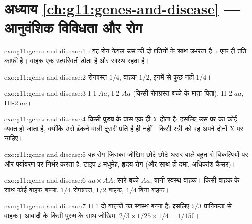 \section*{अध्याय \ref{ch:g11:genes-and-disease} --- आनुवंशिक विविधता और रोग}

\begin{solution}{exo:g11:genes-and-disease:1}
: वह रोग केवल उस  की दो प्रतियों के साथ उभरता है; :
एक ही प्रति काफ़ी है। वाहक एक  उत्परिवर्ती  ढोता है और
स्वस्थ रहता है।
\end{solution}

\begin{solution}{exo:g11:genes-and-disease:2}
रोगग्रस्त $1/4$, वाहक $1/2$, इनमें से कुछ नहीं $1/4$।
\end{solution}

\begin{solution}{exo:g11:genes-and-disease:3}
I-1 $Aa$, I-2 $Aa$ (किसी रोगग्रस्त बच्चे के माता-पिता), II-2 $aa$, III-2
$aa$।
\end{solution}

\begin{solution}{exo:g11:genes-and-disease:4}
किसी पुरुष के पास एक ही X  होता है: इसलिए उस पर का कोई 
 व्यक्त हो जाता है, क्योंकि उसे ढँकने वाली दूसरी प्रति है ही नहीं।
किसी स्त्री को वह  अपने दोनों X  पर चाहिए।
\end{solution}

\begin{solution}{exo:g11:genes-and-disease:5}
वह रोग जिसका जोखिम छोटे-छोटे असर वाले बहुत-से विकल्पियों पर और पर्यावरण पर
निर्भर करता है: टाइप 2 मधुमेह, हृदय रोग (और साथ ही दमा, अधिकांश कैंसर)।
\end{solution}

\begin{solution}{exo:g11:genes-and-disease:6}
$aa \times AA$: सारे बच्चे $Aa$, यानी स्वस्थ वाहक। किसी वाहक के साथ कोई
वाहक बच्चा: $1/4$ रोगग्रस्त, $1/2$ वाहक, $1/4$ बिना वाहक।
\end{solution}

\begin{solution}{exo:g11:genes-and-disease:7}
II-1 दो वाहकों का स्वस्थ बच्चा है: इसलिए $2/3$ प्रायिकता से वाहक। आबादी
के किसी पुरुष के साथ जोखिम: $2/3 \times 1/25 \times 1/4
= 1/150$।
\end{solution}

